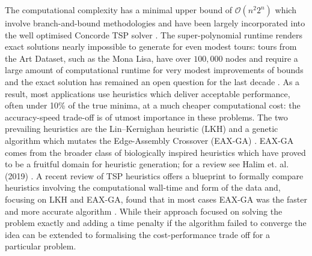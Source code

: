 The computational complexity has a minimal upper bound of $\mathcal{O}(n^2 2^n)$ which involve branch-and-bound methodologies and have been largely incorporated into the well optimised Concorde TSP solver \cite{Applegate2007-nz}. The super-polynomial runtime renders exact solutions nearly impossible to generate for even modest tours: tours from the Art Dataset, such as the Mona Lisa, have over $100,000$ nodes and require a large amount of computational runtime for very modest improvements of bounds and the exact solution has remained an open question for the last decade \cite{ArtTSP}. As a result, most applications use heuristics which deliver acceptable performance, often under 10\% of the true minima, at a much cheaper computational cost: the accuracy-speed trade-off is of utmost importance in these problems. The two prevailing heuristics are the Lin–Kernighan heuristic (LKH) and a genetic algorithm which mutates the Edge-Assembly Crossover (EAX-GA) \cite{Helsgaun2009-dl, Lin1973-pt,  Nagata2013-we, Honda2013-ri}. EAX-GA comes from the broader class of biologically inspired heuristics which have proved to be a fruitful domain for heuristic generation; for a review see Halim et. al. (2019) \cite{Halim2019-ch}. A recent review of TSP heuristics offers a blueprint to formally compare heuristics involving the computational wall-time and form of the data and, focusing on LKH and EAX-GA, found that in most cases EAX-GA was the faster and more accurate algorithm \cite{McMenemy2019-rl}. While their approach focused on solving the problem exactly and adding a time penalty if the algorithm failed to converge the idea can be extended to formalising the cost-performance trade off for a particular problem.
 
